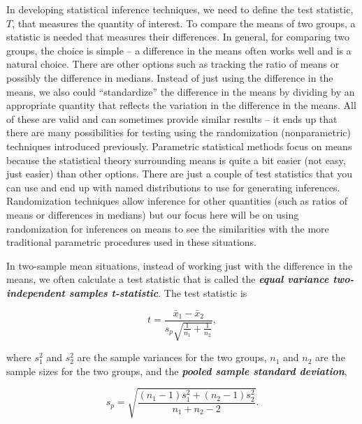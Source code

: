 \documentclass[
]{book}
\begin{document}
In developing statistical inference techniques, we need to define the test
statistic, \(T\), that measures the quantity of interest. To compare the means of
two groups, a statistic is needed
that measures their differences. In general, for comparing two groups, the
choice is simple -- a difference in the means often works well and is a
natural choice. There are other options such as tracking the ratio of means or
possibly the difference in medians. Instead of just using the difference in the
means, we also could ``standardize'' the difference in the means by dividing by
an appropriate quantity that reflects the variation in the difference in the
means. All of these are valid and can sometimes provide similar results -- it
ends up that there are many possibilities for testing using the randomization
(nonparametric)
techniques introduced previously. Parametric
statistical
methods focus on means because the statistical theory surrounding means is
quite a bit easier (not easy, just easier) than other options. There are
just a couple of test statistics that you can use and end up with named
distributions to use for generating inferences. Randomization techniques allow
inference for other quantities (such as ratios of means or differences in medians) but our focus here will be on using
randomization for inferences on means to see the similarities with the more
traditional parametric procedures used in these situations.

\indent In two-sample mean situations, instead of working just with the
difference in the means, we often calculate a test statistic that is called the
\textbf{\emph{equal variance two-independent samples t-statistic}}. The test statistic is

\[t = \frac{\bar{x}_1 - \bar{x}_2}{s_p\sqrt{\frac{1}{n_1}+\frac{1}{n_2}}},\]

where \(s_1^2\) and \(s_2^2\) are the sample variances for the two groups, \(n_1\) and
\(n_2\) are the sample sizes for the two groups, and the
\textbf{\emph{pooled sample standard deviation}},

\[s_p = \sqrt{\frac{(n_1-1)s_1^2 + (n_2-1)s_2^2}{n_1+n_2-2}}.\]
\end{document}
